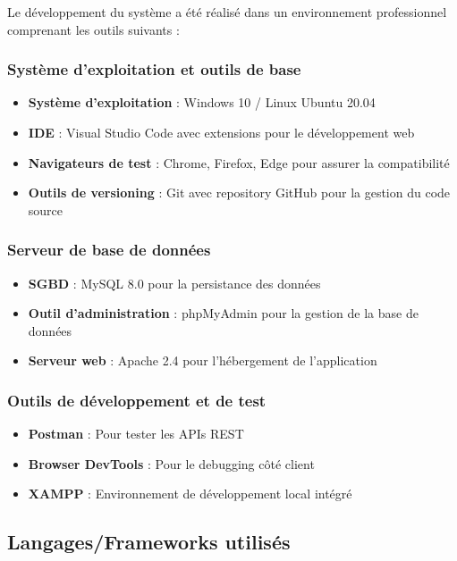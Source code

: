 \documentclass[12pt,a4paper]{report}
\begin{document}
Le développement du système a été réalisé dans un environnement professionnel comprenant les outils suivants :

\subsubsection{Système d'exploitation et outils de base}
\begin{itemize}
    \item \textbf{Système d'exploitation} : Windows 10 / Linux Ubuntu 20.04
    \item \textbf{IDE} : Visual Studio Code avec extensions pour le développement web
    \item \textbf{Navigateurs de test} : Chrome, Firefox, Edge pour assurer la compatibilité
    \item \textbf{Outils de versioning} : Git avec repository GitHub pour la gestion du code source
\end{itemize}

\subsubsection{Serveur de base de données}
\begin{itemize}
    \item \textbf{SGBD} : MySQL 8.0 pour la persistance des données
    \item \textbf{Outil d'administration} : phpMyAdmin pour la gestion de la base de données
    \item \textbf{Serveur web} : Apache 2.4 pour l'hébergement de l'application
\end{itemize}

\subsubsection{Outils de développement et de test}
\begin{itemize}
    \item \textbf{Postman} : Pour tester les APIs REST
    \item \textbf{Browser DevTools} : Pour le debugging côté client
    \item \textbf{XAMPP} : Environnement de développement local intégré
\end{itemize}

\subsection{Langages/Frameworks utilisés}
\end{document}
